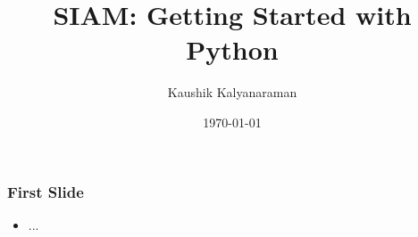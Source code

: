 \documentclass[english,compress]{beamer}
\title{SIAM: Getting Started with Python}
\author{Kaushik Kalyanaraman}
\date{\today}
\begin{document}
\frame{\titlepage}

\frame
{
  \frametitle{First Slide}

  \begin{itemize}
  \item ...
  \end{itemize}
}
\end{document}

